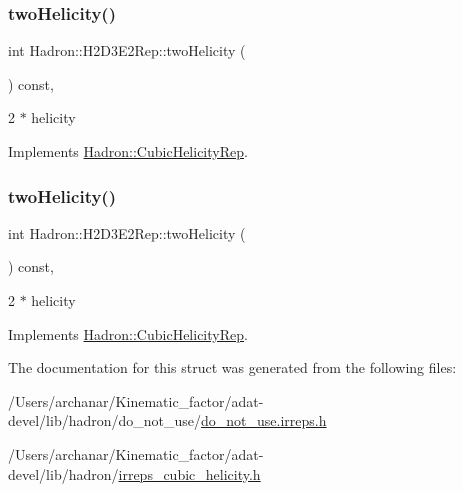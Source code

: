 \subsubsection{\texorpdfstring{twoHelicity()}{twoHelicity()}\hspace{0.1cm}{\footnotesize\ttfamily [2/3]}}
{\footnotesize\ttfamily int Hadron\+::\+H2\+D3\+E2\+Rep\+::two\+Helicity (\begin{DoxyParamCaption}{ }\end{DoxyParamCaption}) const\hspace{0.3cm}{\ttfamily [inline]}, {\ttfamily [virtual]}}

2 $\ast$ helicity 

Implements \mbox{\hyperlink{structHadron_1_1CubicHelicityRep_af507aa56fc2747eacc8cb6c96db31ecc}{Hadron\+::\+Cubic\+Helicity\+Rep}}.

\mbox{\label{structHadron_1_1H2D3E2Rep_a85b69c72b8a1e18f12947d11de0e6561}} 
\subsubsection{\texorpdfstring{twoHelicity()}{twoHelicity()}\hspace{0.1cm}{\footnotesize\ttfamily [3/3]}}
{\footnotesize\ttfamily int Hadron\+::\+H2\+D3\+E2\+Rep\+::two\+Helicity (\begin{DoxyParamCaption}{ }\end{DoxyParamCaption}) const\hspace{0.3cm}{\ttfamily [inline]}, {\ttfamily [virtual]}}

2 $\ast$ helicity 

Implements \mbox{\hyperlink{structHadron_1_1CubicHelicityRep_af507aa56fc2747eacc8cb6c96db31ecc}{Hadron\+::\+Cubic\+Helicity\+Rep}}.



The documentation for this struct was generated from the following files\+:\begin{DoxyCompactItemize}
\item 
/\+Users/archanar/\+Kinematic\+\_\+factor/adat-\/devel/lib/hadron/do\+\_\+not\+\_\+use/\mbox{\hyperlink{adat-devel_2lib_2hadron_2do__not__use_2do__not__use_8irreps_8h}{do\+\_\+not\+\_\+use.\+irreps.\+h}}\item 
/\+Users/archanar/\+Kinematic\+\_\+factor/adat-\/devel/lib/hadron/\mbox{\hyperlink{adat-devel_2lib_2hadron_2irreps__cubic__helicity_8h}{irreps\+\_\+cubic\+\_\+helicity.\+h}}\end{DoxyCompactItemize}
